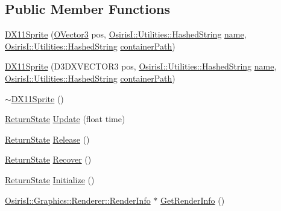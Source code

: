 \subsection*{Public Member Functions}
\begin{DoxyCompactItemize}
\item 
\hyperlink{class_osiris_i_1_1_graphics_1_1_actors_1_1_d_x11_sprite_a658483e7003068432993a54c6ae417a4}{D\-X11\-Sprite} (\hyperlink{struct_osiris_i_1_1_o_vector3}{O\-Vector3} pos, \hyperlink{class_osiris_i_1_1_utilities_1_1_hashed_string}{Osiris\-I\-::\-Utilities\-::\-Hashed\-String} \hyperlink{class_osiris_i_1_1_i_osiris_object_a6a3324b9c5ea3afabc9f3ffd9b666db9}{name}, \hyperlink{class_osiris_i_1_1_utilities_1_1_hashed_string}{Osiris\-I\-::\-Utilities\-::\-Hashed\-String} \hyperlink{class_osiris_i_1_1_graphics_1_1_actors_1_1_i_actor_a71a1f44f10a60275425df720cfa84953}{container\-Path})
\item 
\hyperlink{class_osiris_i_1_1_graphics_1_1_actors_1_1_d_x11_sprite_a2fc00a93173088a82f114c1da176ef7a}{D\-X11\-Sprite} (D3\-D\-X\-V\-E\-C\-T\-O\-R3 pos, \hyperlink{class_osiris_i_1_1_utilities_1_1_hashed_string}{Osiris\-I\-::\-Utilities\-::\-Hashed\-String} \hyperlink{class_osiris_i_1_1_i_osiris_object_a6a3324b9c5ea3afabc9f3ffd9b666db9}{name}, \hyperlink{class_osiris_i_1_1_utilities_1_1_hashed_string}{Osiris\-I\-::\-Utilities\-::\-Hashed\-String} \hyperlink{class_osiris_i_1_1_graphics_1_1_actors_1_1_i_actor_a71a1f44f10a60275425df720cfa84953}{container\-Path})
\item 
\hyperlink{class_osiris_i_1_1_graphics_1_1_actors_1_1_d_x11_sprite_a99451b6e16bf9f2f41c1771df7af9096}{$\sim$\-D\-X11\-Sprite} ()
\item 
\hyperlink{namespace_osiris_i_a8f53bf938dc75c65c6a529694514013e}{Return\-State} \hyperlink{class_osiris_i_1_1_graphics_1_1_actors_1_1_d_x11_sprite_a681551eef6ae7b0b95bc72e18807735c}{Update} (float time)
\item 
\hyperlink{namespace_osiris_i_a8f53bf938dc75c65c6a529694514013e}{Return\-State} \hyperlink{class_osiris_i_1_1_graphics_1_1_actors_1_1_d_x11_sprite_a06e467791896e347f302f5aa383f4675}{Release} ()
\item 
\hyperlink{namespace_osiris_i_a8f53bf938dc75c65c6a529694514013e}{Return\-State} \hyperlink{class_osiris_i_1_1_graphics_1_1_actors_1_1_d_x11_sprite_aafa72d1dd914ac785847d9394ca01140}{Recover} ()
\item 
\hyperlink{namespace_osiris_i_a8f53bf938dc75c65c6a529694514013e}{Return\-State} \hyperlink{class_osiris_i_1_1_graphics_1_1_actors_1_1_d_x11_sprite_a59b7a781ce451eef903b60c1dfd1eef3}{Initialize} ()
\item 
\hyperlink{struct_osiris_i_1_1_graphics_1_1_renderer_1_1_render_info}{Osiris\-I\-::\-Graphics\-::\-Renderer\-::\-Render\-Info} $\ast$ \hyperlink{class_osiris_i_1_1_graphics_1_1_actors_1_1_d_x11_sprite_a3a5f09f11b34d81d868eac619aeba3fb}{Get\-Render\-Info} ()
\end{DoxyCompactItemize}
